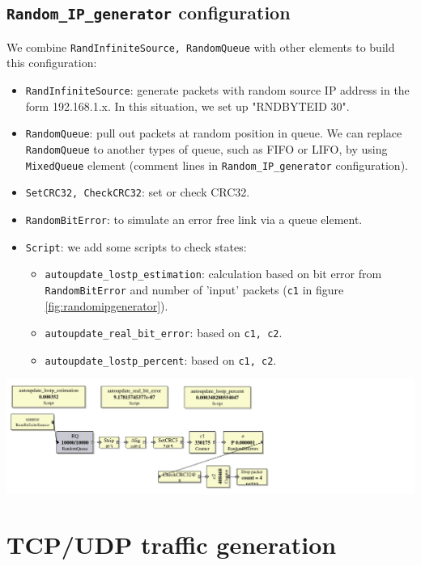 \documentclass[a4paper]{article}
\begin{document}
  \subsection{\texttt{Random\_IP\_generator} configuration}
  We combine \texttt{RandInfiniteSource, RandomQueue} with other elements to build this configuration:
  \begin{itemize}
   	\item \texttt{RandInfiniteSource}: generate packets with random source IP address in the form 192.168.1.x. In this situation, we set up "RNDBYTEID 30".
   	\item \texttt{RandomQueue}: pull out packets at random position in queue. We can replace \texttt{RandomQueue} to another types of queue, such as FIFO or LIFO, by using \texttt{MixedQueue} element (comment lines in \texttt{Random\_IP\_generator} configuration). 
   	\item \texttt{SetCRC32, CheckCRC32}: set or check CRC32.
   	\item \texttt{RandomBitError}: to simulate an error free link via a queue element.
   	\item \texttt{Script}: we add some scripts to check states: 
       	\begin{itemize}
       		\item \texttt{autoupdate\_lostp\_estimation}: calculation based on bit error from \texttt{RandomBitError} and number of 'input' packets (\texttt{c1} in figure \ref{fig:randomipgenerator}).
       		\item \texttt{autoupdate\_real\_bit\_error}: based on \texttt{c1, c2}. 
       		\item \texttt{autoupdate\_lostp\_percent}: based on \texttt{c1, c2}.
       	\end{itemize}
   \end{itemize} 
  \begin{center}
	  \includegraphics[scale=0.55]{Random_IP_generator.pdf}
	  \label{fig:randomipgenerator}
  \end{center}
  \section{TCP/UDP traffic generation}
\end{document}
